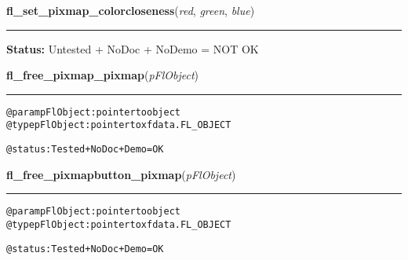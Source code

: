 \hspace{.8\funcindent}\begin{boxedminipage}{\funcwidth}

    \raggedright \textbf{fl\_set\_pixmap\_colorcloseness}(\textit{red}, \textit{green}, \textit{blue})

    \vspace{-1.5ex}

    \rule{\textwidth}{0.5\fboxrule}
\setlength{\parskip}{2ex}
\setlength{\parskip}{1ex}
\textbf{Status:} Untested + NoDoc + NoDemo = NOT OK



    \end{boxedminipage}

    \label{xformslib:flbitmap:fl_free_pixmap_pixmap}

    \vspace{0.5ex}

\hspace{.8\funcindent}\begin{boxedminipage}{\funcwidth}

    \raggedright \textbf{fl\_free\_pixmap\_pixmap}(\textit{pFlObject})

    \vspace{-1.5ex}

    \rule{\textwidth}{0.5\fboxrule}
\setlength{\parskip}{2ex}
\begin{alltt}
        @param pFlObject: pointer to object
@type pFlObject: pointer to xfdata.FL\_OBJECT

        @status: Tested + NoDoc + Demo = OK
    
\end{alltt}

\setlength{\parskip}{1ex}
    \end{boxedminipage}

    \label{xformslib:flbitmap:fl_free_pixmap_pixmap}

    \vspace{0.5ex}

\hspace{.8\funcindent}\begin{boxedminipage}{\funcwidth}

    \raggedright \textbf{fl\_free\_pixmapbutton\_pixmap}(\textit{pFlObject})

    \vspace{-1.5ex}

    \rule{\textwidth}{0.5\fboxrule}
\setlength{\parskip}{2ex}
\begin{alltt}
        @param pFlObject: pointer to object
@type pFlObject: pointer to xfdata.FL\_OBJECT

        @status: Tested + NoDoc + Demo = OK
    
\end{alltt}

\setlength{\parskip}{1ex}
    \end{boxedminipage}

